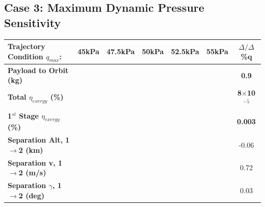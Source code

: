 \subsection{Case 3: Maximum Dynamic Pressure Sensitivity}\label{sec:qvariation}

\begin{table}[ht!] %
	\centering
	\begin{tabular}{l c c c c c c} 
		\hline \textbf{Trajectory Condition  \qquad  $q_{max}$: }
		&45kPa
		&47.5kPa
		&50kPa
		& 52.5kPa
		& 55kPa
		& $\Delta/\Delta$\%q
	\\
	\hline \textbf{Payload to Orbit (kg)}
	& \textbf{\PayloadToOrbitqFortyFiveNoReturn}
	& \textbf{\PayloadToOrbitqFortySevenNoReturn}
	& \textbf{\PayloadToOrbitqStandardNoReturn}
	& \textbf{\PayloadToOrbitqFiftyTwoNoReturn}
	& \textbf{\PayloadToOrbitqFiftyFiveNoReturn}
	&\textbf{0.9}
	\\
	\textbf{Total $\eta_{exergy}$ (\%)}
	& \textbf{\totalExergyEffqFortyFiveNoReturn}
	& \textbf{\totalExergyEffqFortySevenNoReturn}
	& \textbf{\totalExergyEffqStandardNoReturn}
	& \textbf{\totalExergyEffqFiftyTwoNoReturn}
	& \textbf{\totalExergyEffqFiftyFiveNoReturn}
	& \textbf{8$\times$10$^{-5}$}
	\\
	\hline 
	\textbf{1$^{st}$ Stage $\eta_{exergy}$ (\%)}
	& \textbf{\firstExergyEffqFortyFiveNoReturn}
	& \textbf{\firstExergyEffqFortySevenNoReturn}
	& \textbf{\firstExergyEffqStandardNoReturn}
	& \textbf{\firstExergyEffqFiftyTwoNoReturn}
	& \textbf{\firstExergyEffqFiftyFiveNoReturn}
	& \textbf{0.003}
	\\
	\textbf{Separation Alt, 1$\rightarrow$2 (km)}
	& \firstsecondSeparationAltqFortyFiveNoReturn
	& \firstsecondSeparationAltqFortySevenNoReturn
	& \firstsecondSeparationAltqStandardNoReturn
	& \firstsecondSeparationAltqFiftyTwoNoReturn
	& \firstsecondSeparationAltqFiftyFiveNoReturn
	&-0.06
	\\
	\textbf{Separation v, 1$\rightarrow$2 (m/s)}
	& \firstsecondSeparationvqFortyFiveNoReturn
	& \firstsecondSeparationvqFortySevenNoReturn
	& \firstsecondSeparationvqStandardNoReturn
	& \firstsecondSeparationvqFiftyTwoNoReturn
	& \firstsecondSeparationvqFiftyFiveNoReturn
	&0.72
	\\
	\textbf{Separation $\gamma$, 1$\rightarrow$2 (deg)}
	& \firstsecondSeparationgammaqFortyFiveNoReturn
	& \firstsecondSeparationgammaqFortySevenNoReturn
	& \firstsecondSeparationgammaqStandardNoReturn
	& \firstsecondSeparationgammaqFiftyTwoNoReturn
	& \firstsecondSeparationgammaqFiftyFiveNoReturn
	&0.03
	\\

\end{tabular}
\end{table}
